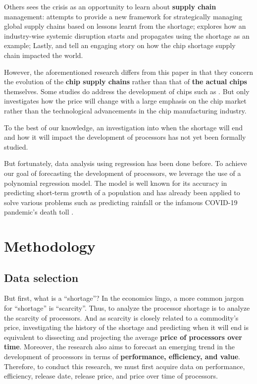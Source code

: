 \documentclass[conference]{IEEEtran}
\begin{document}
Others sees the crisis as an opportunity to learn about \textbf{supply chain}
management: \cite{Jennifer:2022} attempts to provide a new framework for
strategically managing global supply chains based on lessons learnt from the
shortage; \cite{Vinay:2022} explores how an industry-wise systemic
disruption starts and propagates using the shortage as an example;
Lastly, \cite{Duncan:2022} and \cite{Kristin:2022} tell an engaging story
on how the chip shortage supply chain impacted the world.

However, the aforementioned research differs from this paper in that they
concern the evolution of the \textbf{chip supply chains} rather than that of
\textbf{the actual chips} themselves. Some studies do address the
development of chips such as \cite{Stephen:2021}. But \cite{Stephen:2021}
only investigates how the price will change with a large emphasis on the
chip market rather than the technological advancements in the chip
manufacturing industry.

To the
best of our knowledge, an investigation into when the shortage will end and how
it will impact the development of processors has not yet been formally
studied.

But fortunately, data analysis using regression has been done before.
To achieve our goal of forecasting the development of
processors, we leverage the use of a polynomial regression model. The model
is well known for its accuracy in predicting short-term growth of a
population and has already been applied to solve various problems such as
predicting rainfall \cite{Jany:2016} or the infamous COVID-19 pandemic's
death toll \cite{Debanjan:2020}.

\section{Methodology}
\subsection{Data selection}
But first, what is a ``shortage''? In the economics lingo, a more common
jargon for ``shortage'' is ``scarcity''. Thus, to analyze the processor
shortage is to analyze the scarcity of processors. And as scarcity is closely
related to a commodity's price, investigating the history of the shortage and
predicting when it will end is equivalent to dissecting and projecting the
average \textbf{price of processors over time}. Moreover, the research also
aims to forecast an emerging trend in the development of processors in terms of
\textbf{performance, efficiency, and value}. Therefore, to
conduct this research, we must first acquire data on performance,
efficiency, release date, release price, and price over time of processors.
\end{document}
